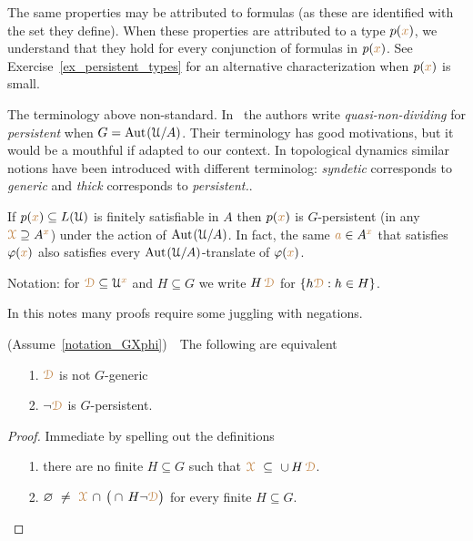 The same properties may be attributed to formulas (as these are identified with the set they define).
When these properties are attributed to a type $p({\color{brown} x})$, we understand that they hold for every conjunction of formulas in $p({\color{brown} x})$.
See Exercise~\ref{ex_persistent_types} for an alternative characterization when $p({\color{brown} x})$ is small.

\noindent\llap{\textcolor{red}{\Large\warning}\kern1.5ex}\ignorespaces
The terminology above non-standard.
In~\cite{CK} the authors write \textit{quasi-non-dividing\/} for \textit{persistent\/} when $G={\rm Aut\kern.15ex}(\EuScript U/A)$.
Their terminology has good motivations, but it would be a mouthful if adapted to our context.
In topological dynamics similar notions have been introduced with different terminolog: \textit{syndetic\/} corresponds to \textit{generic\/} and \textit{thick\/} corresponds to \textit{persistent.}.

\begin{example}
  If $p({\color{brown} x})\subseteq L(\EuScript U)$ is finitely satisfiable in $A$ then $p({\color{brown} x})$ is $G$-persistent (in any ${\color{brown}\EuScript X}\supseteq A^{\color{brown} x}$) under the action of ${\rm Aut\kern.15ex}(\EuScript U/A)$.
  In fact, the same ${\color{brown} a}\in A^{\color{brown} x}$ that satisfies $\varphi({\color{brown} x})$ also satisfies every ${\rm Aut\kern.15ex}(\EuScript U/A)$-translate of $\varphi({\color{brown} x})$.
\end{example}

Notation: for ${\color{brown}\EuScript D}\subseteq\EuScript U^{\color{brown} x}$ and $H\subseteq G$ we write $H\,{\color{brown}\EuScript D}$ for $\{h{\color{brown}\EuScript D}: h\in H\}$.

In this notes many proofs require some juggling with negations.

\begin{fact}\label{fact_fip}
  (Assume~\ref{notation_GXphi})\ \  
  The following are equivalent
  \begin{itemize}
    \item[1.] ${\color{brown}\EuScript D}$ is not $G$-generic
    \item[2.] $\neg{\color{brown}\EuScript D}$ is $G$-persistent.
  \end{itemize}
\end{fact}

\begin{proof}
  Immediate by spelling out the definitions\smallskip
  \begin{itemize}
    \item[1.] there are no finite $H\subseteq G$ such that ${\color{brown}\EuScript X}\ \subseteq\ \cup\, H\,{\color{brown}\EuScript D}$.
    \item[2.]  $\0\ \neq\ \mrX\,\cap\,\big(\cap\, H\neg{\mr\D}\big)$ for every finite $H\subseteq G$.\qedhere
  \end{itemize} 
\end{proof}

